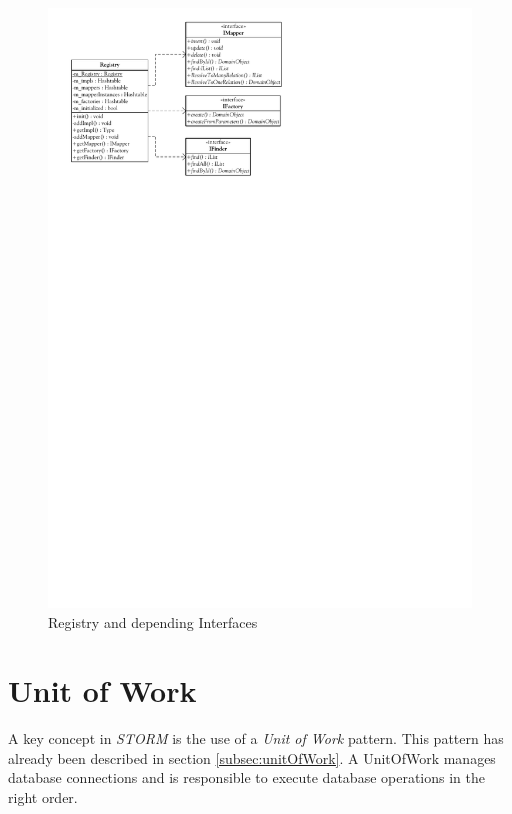 		\begin{figure}[htb]
			\begin{center}
				\includegraphics{./files/inc/figures/DesignRegistryAndInterfaces}
				\caption{\label{fig:designRegistryAndInterfaces} Registry and depending Interfaces}
			\end{center}
		\end{figure}
		
	\section{Unit of Work}
		A key concept in \textit{STORM} is the use of a \textit{Unit of Work} pattern. This pattern has
		already been described in section \ref{subsec:unitOfWork}. A UnitOfWork manages database
		connections and is responsible to execute database operations in the right order.
		
